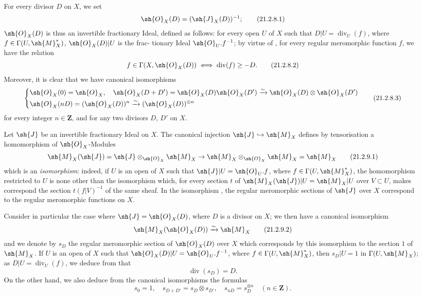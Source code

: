 \begin{env}[21.2.8]
\label{IV.21.2.8}
For every divisor $D$ on $X$, we set
\[
\label{IV.21.2.8.1}
  \sh{O}_X(D)=(\sh{J}_X(D))^{-1};
  \tag{21.2.8.1}
\]
$\sh{O}_X(D)$ is thus an invertible fractionary Ideal, defined as follows:
for every open $U$ of $X$ such that $D|U=\operatorname{div}_U(f)$, where $f\in\Gamma(U,\sh{M}_X^*)$, $\sh{O}_X(D)|U$ is the frac-
tionary Ideal $\sh{O}_U.f^{-1}$;
by virtue of , for every regular meromorphic function $f$, we have the relation
\[
\label{IV.21.2.8.2}
  f\in\Gamma(X,\sh{O}_X(D)) \iff \operatorname{div}(f)\geq -D.
  \tag{21.2.8.2}
\]
Moreover, it is clear that we have canonical isomorphisms 
\[
\label{IV.21.2.8.3}
  \left\{\begin{aligned}
    &\sh{O}_X(0)=\sh{O}_X,\quad \sh{O}_X(D+D')=\sh{O}_X(D)\sh{O}_X(D')\xrightarrow{\sim}\sh{O}_X(D)\otimes\sh{O}_X(D')\\
    &\sh{O}_X(nD)=(\sh{O}_X(D))^n\xrightarrow{\sim}(\sh{O}_X(D))^{\otimes n}
  \end{aligned}\right.
  \tag{21.2.8.3}
\]
for every integer $n\in\mathbf{Z}$, and for any two divisors $D$, $D'$ on $X$.
\end{env}

\begin{env}[21.2.9]
\label{IV.21.2.9}
Let $\sh{J}$ be an invertible fractionary Ideal on $X$.
The canonical injection $\sh{J}\hookrightarrow\sh{M}_X$ defines by tensorisation a homomorphism of $\sh{O}_X$-Modules
\[
\label{IV.21.2.9.1}
  \sh{M}_X(\sh{J})=\sh{J}\otimes_{\sh{O}_X}\sh{M}_X\to\sh{M}_X\otimes_{\sh{O}_X}\sh{M}_X=\sh{M}_X
  \tag{21.2.9.1}
\]
which is an \emph{isomorphism}:
indeed, if $U$ is an open of $X$ such that $\sh{J}|U=\sh{O}_U.f$, where $f\in\Gamma(U,\sh{M}_X^*)$, the homomorphism  restricted to $U$ is none other than the isomorphism which, for every section $t$ of $\sh{M}_X(\sh{J})|U=\sh{M}_X|U$ over $V\subset U$, makes correspond the section $t(f|V)^{-1}$ of the same sheaf.
In the isomorphism , the regular meromorphic sections of $\sh{J}$ over $X$ correspond to the regular meromorphic functions on $X$.

Consider in particular the case where $\sh{J}=\sh{O}_X(D)$, where $D$ is a divisor on $X$;
we then have a canonical isomorphism
\[
\label{IV.21.2.9.2}
  \sh{M}_X(\sh{O}_X(D))\xrightarrow{\sim}\sh{M}_X
  \tag{21.2.9.2}
\]
and we denote by $s_D$ the regular meromorphic section of $\sh{O}_X(D)$ over $X$ which corresponds by this isomorphism to the section $1$ of $\sh{M}_X$.
If $U$ is an open of $X$ such that $\sh{O}_X(D)|U=\sh{O}_U.f^{-1}$, where $f\in\Gamma(U,\sh{M}_X^*)$, then $s_D|U=1$ in $\Gamma(U,\sh{M}_X)$;
as $D|U=\operatorname{div}_U(f)$, we deduce from  that
\[
\label{IV.21.2.9.3}
  \operatorname{div}(s_D)=D.
  \tag{21.2.9.3}
\]
On the other hand, we also deduce from the canonical isomorphisms  the formulas
\[
\label{IV.21.2.9.4}
  s_0=1,\quad s_{D+D'}=s_D\otimes s_{D'},\quad s_{nD}=s_D^{\otimes n}\quad (n\in\mathbf{Z}).
  \tag{21.2.9.4}
\]
\end{env}

